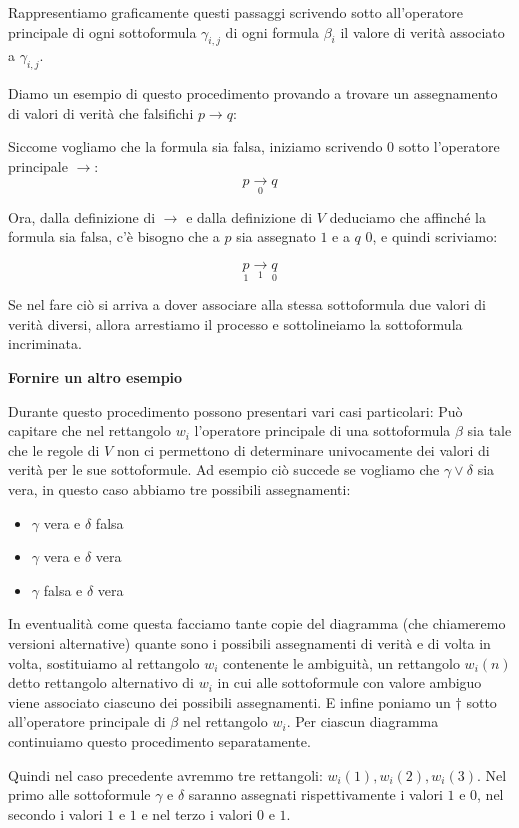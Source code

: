 \documentclass[a4paper, titlepage, 12pt]{report}
\begin{document}
Rappresentiamo graficamente questi passaggi scrivendo sotto all'operatore principale
di ogni sottoformula $\gamma_{i,j}$ di ogni formula $\beta_i$
il valore di verità associato a $\gamma_{i,j}$.

Diamo un esempio di questo procedimento provando a trovare un assegnamento
di valori di verità che falsifichi $p \rightarrow q$:

Siccome vogliamo che la formula sia falsa, iniziamo scrivendo $0$ sotto l'operatore principale $\rightarrow$:
$$p \underset{0}{\rightarrow} q$$

Ora, dalla definizione di $\rightarrow$ e dalla definizione di $V$
deduciamo che affinché la formula sia falsa, c'è bisogno
che a $p$ sia assegnato $1$ e a $q$ $0$, e quindi scriviamo:

$$\underset{1}{p} \underset{1}{\rightarrow} \underset{0}{q}$$

Se nel fare ciò si arriva a dover associare alla stessa sottoformula
due valori di verità diversi, allora arrestiamo il processo e sottolineiamo
la sottoformula incriminata.

\textbf{Fornire un altro esempio}

Durante questo procedimento possono presentari vari casi particolari:
Può capitare che nel rettangolo $w_i$ l'operatore principale di una sottoformula $\beta$ sia tale che le regole di $V$
non ci permettono di determinare univocamente dei valori di verità per le sue sottoformule.
Ad esempio ciò succede se vogliamo che $\gamma \lor \delta$ sia vera, in questo caso abbiamo tre possibili
assegnamenti:
\begin{itemize}
    \item $\gamma$ vera  e $\delta$ falsa
    \item $\gamma$ vera  e $\delta$ vera
    \item $\gamma$ falsa e $\delta$ vera
\end{itemize}

In eventualità come questa facciamo tante copie del diagramma (che chiameremo versioni alternative)
quante sono i possibili assegnamenti di verità e di volta in volta, sostituiamo al rettangolo $w_i$ contenente le ambiguità,
un rettangolo $w_i(n)$ detto rettangolo alternativo di $w_i$ in cui alle sottoformule
con valore ambiguo viene associato ciascuno dei possibili assegnamenti.
E infine poniamo un $\dagger$ sotto all'operatore principale di $\beta$ nel rettangolo $w_i$.
Per ciascun diagramma continuiamo questo procedimento separatamente.

Quindi nel caso precedente avremmo tre rettangoli: $w_i(1), w_i(2), w_i(3)$.
Nel primo alle sottoformule $\gamma$ e $\delta$ saranno assegnati rispettivamente i valori $1$ e $0$,
nel secondo i valori $1$ e $1$ e nel terzo i valori $0$ e $1$.
\end{document}

